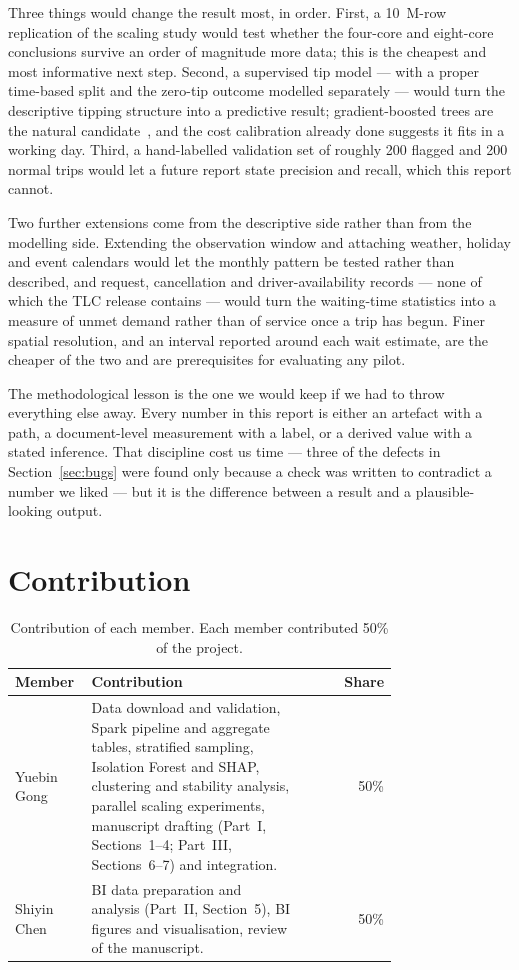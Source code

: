 \documentclass[11pt,a4paper]{article}
\begin{document}
Three things would change the result most, in order. First, a 10~M-row replication of the scaling study would test whether the four-core and eight-core conclusions survive an order of magnitude more data; this is the cheapest and most informative next step. Second, a supervised tip model --- with a proper time-based split and the zero-tip outcome modelled separately --- would turn the descriptive tipping structure into a predictive result; gradient-boosted trees are the natural candidate~\cite{xgboost}, and the cost calibration already done suggests it fits in a working day. Third, a hand-labelled validation set of roughly 200 flagged and 200 normal trips would let a future report state precision and recall, which this report cannot.

Two further extensions come from the descriptive side rather than from the modelling
side. Extending the observation window and attaching weather, holiday and event
calendars would let the monthly pattern be tested rather than described, and request,
cancellation and driver-availability records --- none of which the TLC release contains
--- would turn the waiting-time statistics into a measure of unmet demand rather than of
service once a trip has begun. Finer spatial resolution, and an interval reported around
each wait estimate, are the cheaper of the two and are prerequisites for evaluating any
pilot.

The methodological lesson is the one we would keep if we had to throw everything else away. Every number in this report is either an artefact with a path, a document-level measurement with a label, or a derived value with a stated inference. That discipline cost us time --- three of the defects in Section~\ref{sec:bugs} were found only because a check was written to contradict a number we liked --- but it is the difference between a result and a plausible-looking output.

\section*{Contribution}

\begin{table}[h]
\centering
\small
\caption{Contribution of each member. Each member contributed 50\% of the project.}
\label{tab:contribution}
\begin{tabular}{p{0.20\linewidth}p{0.56\linewidth}r}
\toprule
Member & Contribution & Share \\
\midrule
Yuebin Gong & Data download and validation, Spark pipeline and aggregate tables, stratified sampling, Isolation Forest and SHAP, clustering and stability analysis, parallel scaling experiments, manuscript drafting (Part~I, Sections~1--4; Part~III, Sections~6--7) and integration. & 50\% \\
Shiyin Chen & BI data preparation and analysis (Part~II, Section~5), BI figures and visualisation, review of the manuscript. & 50\% \\
\bottomrule
\end{tabular}
\end{table}
\end{document}
